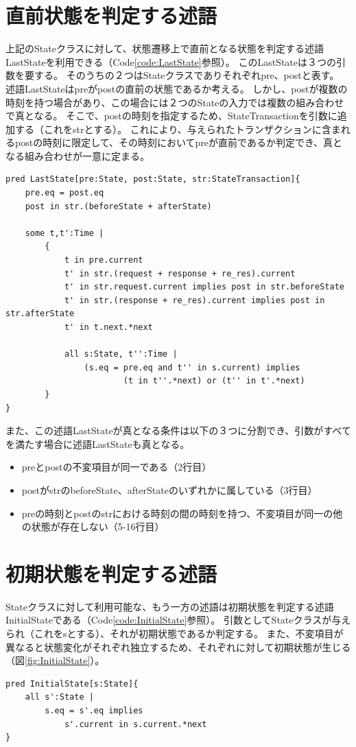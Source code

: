 \documentclass[12pt,a4paper]{jbook}
\begin{document}
\section{直前状態を判定する述語}
上記のStateクラスに対して、状態遷移上で直前となる状態を判定する述語LastStateを利用できる（Code\ref{code:LastState}参照）。
このLastStateは３つの引数を要する。
そのうちの２つはStateクラスでありそれぞれpre、postと表す。
述語LastStateはpreがpostの直前の状態であるか考える。
しかし、postが複数の時刻を持つ場合があり、この場合には２つのStateの入力では複数の組み合わせで真となる。
そこで、postの時刻を指定するため、StateTransactionを引数に追加する（これをstrとする）。
これにより、与えられたトランザクションに含まれるpostの時刻に限定して、その時刻においてpreが直前であるか判定でき、真となる組み合わせが一意に定まる。
\begin{lstlisting}[caption=状態遷移において直前の状態を判定する述語, label=code:LastState]
pred LastState[pre:State, post:State, str:StateTransaction]{
	pre.eq = post.eq
	post in str.(beforeState + afterState)

	some t,t':Time |
		{
			t in pre.current
			t' in str.(request + response + re_res).current
			t' in str.request.current implies post in str.beforeState
			t' in str.(response + re_res).current implies post in str.afterState
			t' in t.next.*next

			all s:State, t'':Time |
				(s.eq = pre.eq and t'' in s.current) implies
						(t in t''.*next) or (t'' in t'.*next)
		}
}
\end{lstlisting}

また、この述語LastStateが真となる条件は以下の３つに分割でき、引数がすべてを満たす場合に述語LastStateも真となる。
\begin{itemize}
\item preとpostの不変項目が同一である（2行目）
\item postがstrのbeforeState、afterStateのいずれかに属している（3行目）
\item preの時刻とpostのstrにおける時刻の間の時刻を持つ、不変項目が同一の他の状態が存在しない（5-16行目）
\end{itemize}

\section{初期状態を判定する述語}
Stateクラスに対して利用可能な、もう一方の述語は初期状態を判定する述語InitialStateである（Code\ref{code:InitialState}参照）。
引数としてStateクラスが与えられ（これをsとする）、それが初期状態であるか判定する。
また、不変項目が異なると状態変化がそれぞれ独立するため、それぞれに対して初期状態が生じる（図\ref{fig:InitialState}）。
\begin{lstlisting}[caption=状態遷移において初期状態を判定する述語, label=code:InitialState]
pred InitialState[s:State]{
	all s':State |
		s.eq = s'.eq implies
			s'.current in s.current.*next
}
\end{lstlisting}
\end{document}

